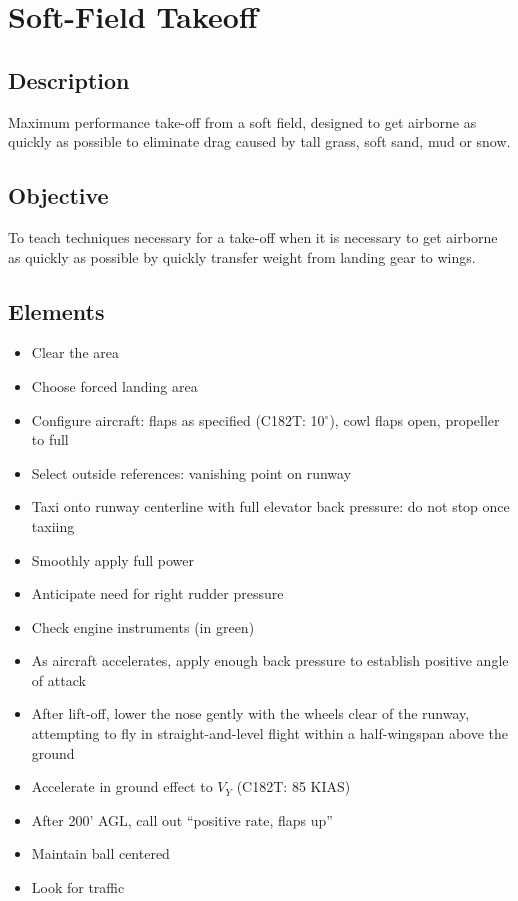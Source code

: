 \section{Soft-Field Takeoff}

\subsection{Description}

Maximum performance take-off from a soft field, designed to get airborne as
quickly as possible to eliminate drag caused by tall grass, soft sand, mud or
snow.

\subsection{Objective}

To teach techniques necessary for a take-off when it is necessary to get
airborne as quickly as possible by quickly transfer weight from landing gear to
wings.

\subsection{Elements}

\begin{itemize}
  \item Clear the area
  \item Choose forced landing area
  \item Configure aircraft: flaps as specified (C182T: 10$^\circ$), cowl flaps
    open, propeller to full
  \item Select outside references: vanishing point on runway
  \item Taxi onto runway centerline with full elevator back pressure: do not
    stop once taxiing
  \item Smoothly apply full power
  \item Anticipate need for right rudder pressure
  \item Check engine instruments (in green)
  \item As aircraft accelerates, apply enough back pressure to establish
    positive angle of attack
  \item After lift-off, lower the nose gently with the wheels clear of the
    runway, attempting to fly in straight-and-level flight within a
    half-wingspan above the ground
  \item Accelerate in ground effect to $V_Y$ (C182T: 85 KIAS)
  \item After 200' AGL, call out ``positive rate, flaps up''
  \item Maintain ball centered 
  \item Look for traffic
\end{itemize}

